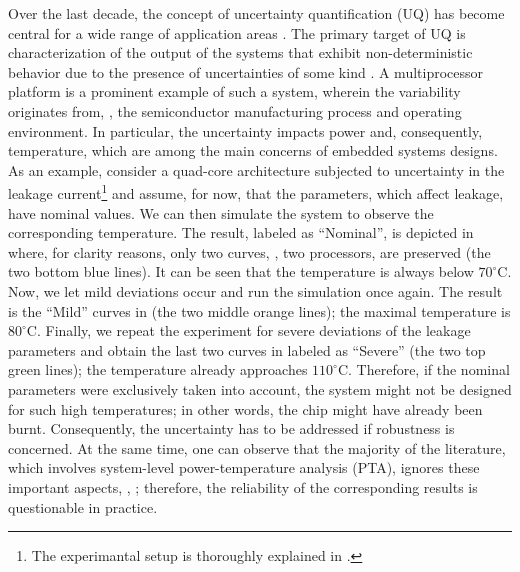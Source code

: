 Over the last decade, the concept of uncertainty quantification (UQ) has become central for a wide range of application areas \cite{xiu2010}. The primary target of UQ is characterization of the output of the systems that exhibit non-deterministic behavior due to the presence of uncertainties of some kind \cite{eldred2009}. A multiprocessor platform is a prominent example of such a system, wherein the variability originates from, \eg, the semiconductor manufacturing process and operating environment. In particular, the uncertainty impacts power and, consequently, temperature, which are among the main concerns of embedded systems designs. As an example, consider a quad-core architecture subjected to uncertainty in the leakage current\footnote{The experimantal setup is thoroughly explained in .} and assume, for now, that the parameters, which affect leakage, have nominal values. We can then simulate the system to observe the corresponding temperature. The result, labeled as ``Nominal'', is depicted in  where, for clarity reasons, only two curves, \ie, two processors, are preserved (the two bottom blue lines). It can be seen that the temperature is always below $70^{\circ}$C. Now, we let mild deviations occur and run the simulation once again. The result is the ``Mild'' curves in  (the two middle orange lines); the maximal temperature is $80^{\circ}$C. Finally, we repeat the experiment for severe deviations of the leakage parameters and obtain the last two curves in  labeled as ``Severe'' (the two top green lines); the temperature already approaches $110^{\circ}$C. Therefore, if the nominal parameters were exclusively taken into account, the system might not be designed for such high temperatures; in other words, the chip might have already been burnt. Consequently, the uncertainty has to be addressed if robustness is concerned. At the same time, one can observe that the majority of the literature, which involves system-level power-temperature analysis (PTA), ignores these important aspects, \eg, \cite{rao2009, rai2011, thiele2011, ukhov2012}; therefore, the reliability of the corresponding results is questionable in practice.

